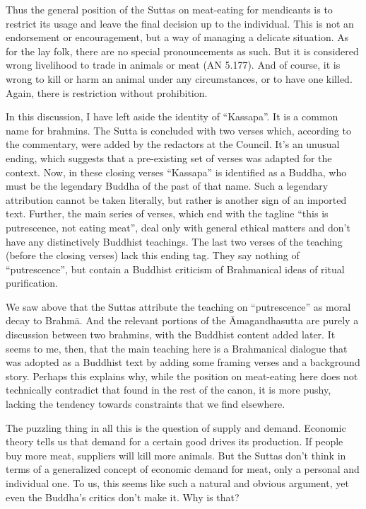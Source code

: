 \documentclass[12pt,openany]{book}%
\begin{document}
Thus the general position of the Suttas on meat-eating for mendicants is to restrict its usage and leave the final decision up to the individual. This is not an endorsement or encouragement, but a way of managing a delicate situation. As for the lay folk, there are no special pronouncements as such. But it is considered wrong livelihood to trade in animals or meat (AN 5.177). And of course, it is wrong to kill or harm an animal under any circumstances, or to have one killed. Again, there is restriction without prohibition.

In this discussion, I have left aside the identity of “Kassapa”. It is a common name for brahmins. The Sutta is concluded with two verses which, according to the commentary, were added by the redactors at the Council. It’s an unusual ending, which suggests that a pre-existing set of verses was adapted for the context. Now, in these closing verses “Kassapa” is identified as a Buddha, who must be the legendary Buddha of the past of that name. Such a legendary attribution cannot be taken literally, but rather is another sign of an imported text. Further, the main series of verses, which end with the tagline “this is putrescence, not eating meat”, deal only with general ethical matters and don’t have any distinctively Buddhist teachings. The last two verses of the teaching (before the closing verses) lack this ending tag. They say nothing of “putrescence”, but contain a Buddhist criticism of Brahmanical ideas of ritual purification.

We saw above that the Suttas attribute the teaching on “putrescence” as moral decay to \textsanskrit{Brahmā}. And the relevant portions of the Āmagandhasutta are purely a discussion between two brahmins, with the Buddhist content added later. It seems to me, then, that the main teaching here is a Brahmanical dialogue that was adopted as a Buddhist text by adding some framing verses and a background story. Perhaps this explains why, while the position on meat-eating here does not technically contradict that found in the rest of the canon, it is more pushy, lacking the tendency towards constraints that we find elsewhere.

The puzzling thing in all this is the question of supply and demand. Economic theory tells us that demand for a certain good drives its production. If people buy more meat, suppliers will kill more animals. But the Suttas don’t think in terms of a generalized concept of economic demand for meat, only a personal and individual one. To us, this seems like such a natural and obvious argument, yet even the Buddha’s critics don’t make it. Why is that?
\end{document}
